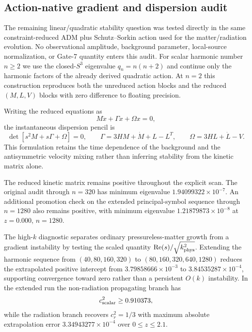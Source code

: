 \subsection{Action-native gradient and dispersion audit}
\label{sec:action-native-gradient-dispersion}

The remaining linear/quadratic stability question was tested directly in the
same constraint-reduced ADM plus Schutz--Sorkin action used for the
matter/radiation evolution. No observational amplitude, background parameter,
local-source normalization, or Gate-7 quantity enters this audit. For scalar
harmonic number $n\ge2$ we use the closed-$S^3$ eigenvalue
$q_n=n(n+2)$ and continue only the harmonic factors of the already derived
quadratic action. At $n=2$ this construction reproduces both the unreduced
action blocks and the reduced $(M,L,V)$ blocks with zero difference to
floating precision.

Writing the reduced equations as
\begin{equation}
M\ddot x+\Gamma\dot x+\Omega x=0,
\end{equation}
the instantaneous dispersion pencil is
\begin{equation}
\det\!\left[s^2M+s\Gamma+\Omega\right]=0,
\qquad
\Gamma=3HM+\dot M+L-L^T,
\qquad
\Omega=3HL+\dot L-V .
\end{equation}
This formulation retains the time dependence of the background and the
antisymmetric velocity mixing rather than inferring stability from the kinetic
matrix alone.

The reduced kinetic matrix remains positive throughout the explicit scan.
The original audit through $n=320$ has minimum eigenvalue
$1.94099322\times10^{-7}$. An additional promotion check on the extended
principal-symbol sequence through $n=1280$ also remains
positive, with minimum eigenvalue $1.21879873\times10^{-8}$ at
$z=0.000$, $n=1280$.

The high-$k$ diagnostic separates ordinary pressureless-matter growth from a
gradient instability by testing the scaled quantity
$\mathrm{Re}(s)/\sqrt{k_{\rm phys}^2}$. Extending the harmonic sequence
from $(40,80,160,320)$ to $(80,160,320,640,1280)$ reduces the extrapolated
positive intercept from $3.79858666\times10^{-3}$ to $3.84535287\times10^{-4}$,
supporting convergence toward zero rather than a persistent $O(k)$
instability. In the extended run the non-radiation propagating branch has
\begin{equation}
c_{\rm scalar}^2 \ge 0.910373,
\end{equation}
while the radiation branch recovers $c_r^2=1/3$ with maximum absolute
extrapolation error $3.34943277\times10^{-4}$ over $0\le z\le2.1$.

